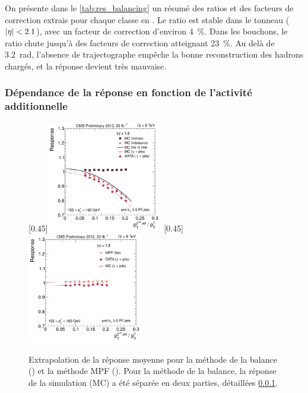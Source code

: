 \bigskip

On présente dans le \cref{tab:res_balancing} un résumé des ratios et des facteurs de correction extrais pour chaque classe en \aeta. Le ratio est stable dans le tonneau ($\lvert \eta \rvert < \num{2.1}$), avec un facteur de correction d'environ \SI{4}{\%}. Dans les bouchons, le ratio chute jusqu'à des facteurs de correction atteignant \SI{23}{\%}. Au delà de \SI{3.2}{\radian}, l'absence de trajectographe empêche la bonne reconstruction des hadrons chargés, et la réponse devient très mauvaise.

\subsubsection{Dépendance de la réponse en fonction de l'activité additionnelle} \label{sec:res_balancing_extrap}

\begin{figure}[tbp]
    \centering
    \subcaptionbox{\label{fig:extrap_balancing}}[0.45\textwidth]{\includegraphics[width=0.45\textwidth]{chapitre4/figs/extrap/response_eta013_ptPhot_155_180.pdf}}\hfill
    \subcaptionbox{\label{fig:extrap_mpf}}[0.45\textwidth]{\includegraphics[width=0.45\textwidth]{chapitre4/figs/extrap/responseMPF_eta013_ptPhot_155_180.pdf}}
    \caption{Extrapolation de la réponse moyenne pour la méthode de la balance () et la méthode MPF (). Pour la méthode de la balance, la réponse de la simulation (MC) a été séparée en deux parties, détaillées \cref{sec:res_balancing_extrap}.}
\end{figure}


